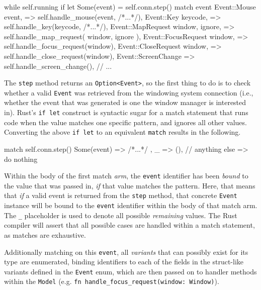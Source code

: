 \begin{rustblock}
  while self.running {
    if let Some(event) = self.conn.step() {
      match event {
        Event::Mouse { event, }
          => self.handle_mouse(event, /*...*/),
        Event::Key { keycode, }
          => self.handle_key(keycode, /*...*/),
        Event::MapRequest { window, ignore, }
          => self.handle_map_request(
            window, ignore
          ),
        Event::FocusRequest { window, }
          => self.handle_focus_request(window),
        Event::CloseRequest { window, }
          => self.handle_close_request(window),
        Event::ScreenChange
          => self.handle_screen_change(),
        // ...
      }
    }
  }
\end{rustblock}

The  \texttt{step} method  returns an  \texttt{Option<Event>}, so  the
first thing to do is to check  whether a valid \texttt{Event} was retrieved from
the  windowing system  connection (i.e.,  whether the  event that  was generated
is  one  the  window  manager is  interested  in).  Rust's  \texttt{if
let}  construct  is  syntactic  sugar  for a  match  statement  that  runs  code
when  the   value  matches   one  specific  pattern,   and  ignores   all  other
values\cite{therustbook}. Converting  the above \texttt{if let}  to an
equivalent \texttt{match} results in the following.

\begin{rustblock}
  match self.conn.step() {
    Some(event) => { /*...*/ },
    _ => (), // anything else => do nothing
  }
\end{rustblock}

Within the body  of the first match \textit{arm},  the \texttt{event} identifier
has been \textit{bound} to the value  that was passed in, \textit{if} that value
matches the pattern\cite{therustbook}. Here, that means that \textit{if} a valid
event is  returned from the  \texttt{step} method, that  concrete \texttt{Event}
instance  will be  bound to  the \texttt{event}  identifier within  the body  of
that  match arm.  The \texttt{\_}  placeholder is  used to  denote all  possible
\textit{remaining} values\cite{therustbook}. The Rust  compiler will assert that
all  possible  cases are  handled  within  a  match  statement, as  matches  are
exhaustive\cite{therustbook}.

Additionally  matching on  this \texttt{event},  all \textit{variants}  that can
possibly  exist for  its type  are enumerated,  binding identifiers  to each  of
the  fields in  the struct-like  variants  defined in  the \texttt{Event}  enum,
which are  then passed  on to  handler methods  within the  \texttt{Model} (e.g.
\texttt{fn handle_focus_request(window: Window)}).
